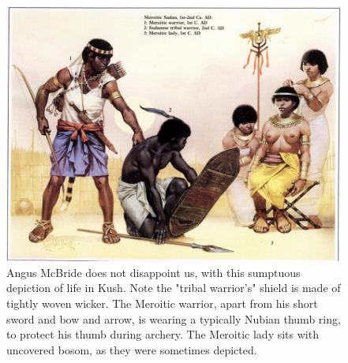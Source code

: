 \documentclass[a4paper,12pt]{scrreprt}
\begin{document}
\begin{figure}[H]
	\centering
	\includegraphics[width=\textwidth]{img/life_kush_drawing}
	\caption{Angus McBride does not disappoint us, with this sumptuous depiction of life in Kush. Note the "tribal warrior's" shield is made of tightly woven wicker. The Meroitic warrior, apart from his short sword and bow and arrow, is wearing a typically Nubian thumb ring, to protect his thumb during archery. The Meroitic lady sits with uncovered bosom, as they were sometimes depicted. }
\end{figure}
\end{document}
